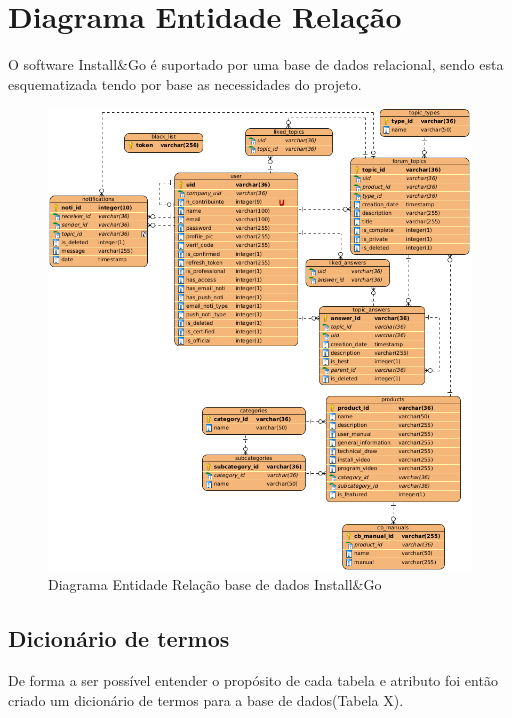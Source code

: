 \section{Diagrama Entidade Relação}

O software Install\&Go é suportado por uma base de dados relacional, 
sendo esta esquematizada tendo por base as necessidades do projeto.

\begin{figure}[htb]
    \centering
    
    \includegraphics[width=\textwidth]{images/diagramas/diagrama_bd.png}
    \caption{Diagrama Entidade Relação base de dados Install\&Go}
    \label{fig:14}
\end{figure}

\newpage

\subsection{Dicionário de termos}

De forma a ser possível entender o propósito de cada tabela e atributo 
foi então criado um dicionário de termos para a base de dados(Tabela X).

